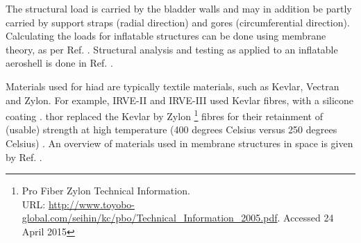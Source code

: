 The structural load is carried by the bladder walls and may in addition be partly carried by support straps (radial direction) and gores (circumferential direction). Calculating the loads for inflatable structures can be done using membrane theory, as per Ref. \cite{Roark}. Structural analysis and testing as applied to an inflatable aeroshell is done in Ref. \cite{Lindell2011}.

Materials used for \gls{hiad} are typically textile materials, such as Kevlar, Vectran and Zylon. For example, IRVE-II and IRVE-III used Kevlar fibres, with a silicone coating \cite{Dillman2012a}. \gls{thor} replaced the Kevlar by Zylon \footnote{Pro Fiber Zylon Technical Information. \\ URL: \url{http://www.toyobo-global.com/seihin/kc/pbo/Technical\_Information\_2005.pdf}. Accessed 24 April 2015} fibres for their retainment of (usable) strength at high temperature (400 degrees Celsius versus 250 degrees Celsius) \cite{Dillman2014}. An overview of materials used in membrane structures in space is given by Ref. \cite{Jenkins2001}.













